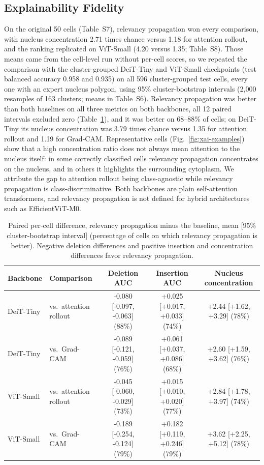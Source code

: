 \documentclass[12pt,letterpaper]{article}
\begin{document}
\subsection{Explainability Fidelity}
\label{sec:xai-results}
\label{sec:xai-full}
On the original 50 cells (Table~S7), relevancy propagation won every comparison, with nucleus concentration 2.71 times chance versus 1.18 for attention rollout, and the ranking replicated on ViT-Small (4.20 versus 1.35; Table~S8). Those means came from the cell-level run without per-cell scores, so we repeated the comparison with the cluster-grouped DeiT-Tiny and ViT-Small checkpoints (test balanced accuracy 0.958 and 0.935) on all 596 cluster-grouped test cells, every one with an expert nucleus polygon, using 95\% cluster-bootstrap intervals (2,000 resamples of 163 clusters; means in Table~S6). Relevancy propagation was better than both baselines on all three metrics on both backbones, all 12 paired intervals excluded zero (Table~\ref{tab:xai-paired}), and it was better on 68--88\% of cells; on DeiT-Tiny its nucleus concentration was 3.79 times chance versus 1.35 for attention rollout and 1.19 for Grad-CAM. Representative cells (Fig.~\ref{fig:xai-examples}) show that a high concentration ratio does not always mean attention to the nucleus itself: in some correctly classified cells relevancy propagation concentrates on the nucleus, and in others it highlights the surrounding cytoplasm. We attribute the gap to attention rollout being class-agnostic while relevancy propagation is class-discriminative. Both backbones are plain self-attention transformers, and relevancy propagation is not defined for hybrid architectures such as EfficientViT-M0.

\begin{table}[htbp]
\centering
\caption{Paired per-cell difference, relevancy propagation minus the baseline, mean [95\% cluster-bootstrap interval] (percentage of cells on which relevancy propagation is better). Negative deletion differences and positive insertion and concentration differences favor relevancy propagation.}
\label{tab:xai-paired}
\footnotesize
\begin{tabular}{@{}llccc@{}}
\toprule
Backbone & Comparison & Deletion AUC & Insertion AUC & Nucleus concentration \\
\midrule
DeiT-Tiny & vs.\ attention rollout & -0.080 [-0.097, -0.063] (88\%) & +0.025 [+0.017, +0.033] (74\%) & +2.44 [+1.62, +3.29] (78\%) \\
DeiT-Tiny & vs.\ Grad-CAM & -0.089 [-0.121, -0.059] (76\%) & +0.061 [+0.037, +0.086] (68\%) & +2.60 [+1.59, +3.62] (76\%) \\
\addlinespace
ViT-Small & vs.\ attention rollout & -0.045 [-0.060, -0.029] (73\%) & +0.015 [+0.010, +0.020] (77\%) & +2.84 [+1.78, +3.97] (74\%) \\
ViT-Small & vs.\ Grad-CAM & -0.189 [-0.254, -0.124] (79\%) & +0.182 [+0.119, +0.246] (79\%) & +3.62 [+2.25, +5.12] (78\%) \\
\bottomrule
\end{tabular}
\end{table}
\end{document}
